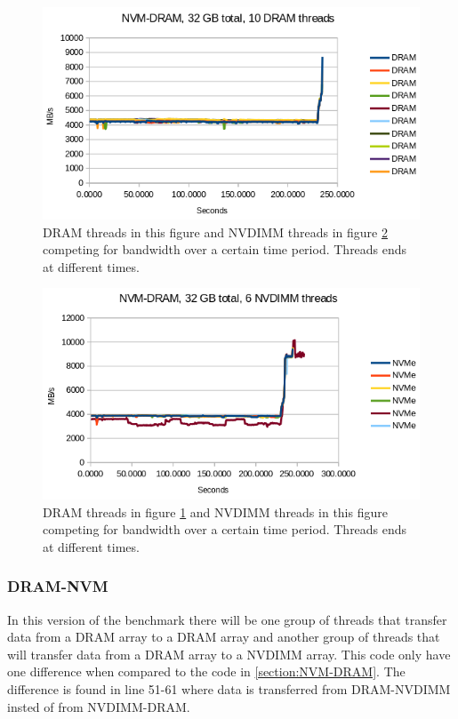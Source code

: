\documentclass[12pt,a4paper,USenglish]{article}      %
\begin{document}
\begin{figure}[!hbtp]
\includegraphics[scale=0.7]{Benchmarks/NVM-DRAM_32GB_10_DRAM_Threads.png}
\caption{DRAM threads in this figure and NVDIMM threads in figure \ref{fig:NVM_DRAM_sec2} competing for bandwidth over a certain time period. Threads ends at different times.}
\label{fig:NVM_DRAM_sec1}
\end{figure}

\begin{figure}[!hbtp]
\includegraphics[scale=0.7]{Benchmarks/NVM-DRAM_32GB_6_NVDIMM_Threads.png}
\caption{DRAM threads in figure \ref{fig:NVM_DRAM_sec1} and NVDIMM threads in this figure competing for bandwidth over a certain time period. Threads ends at different times.}
\label{fig:NVM_DRAM_sec2}
\end{figure}

\pagebreak
\subsubsection{DRAM-NVM}
\label{section:DRAM-NVM}
In this version of the benchmark there will be one group of threads that transfer data from a DRAM array to a DRAM array and another group of threads that will transfer data from a DRAM array to a NVDIMM array. This code only have one difference when compared to the code in \ref{section:NVM-DRAM}. The difference is found in line 51-61 where data is transferred from DRAM-NVDIMM insted of from NVDIMM-DRAM.
\end{document}
